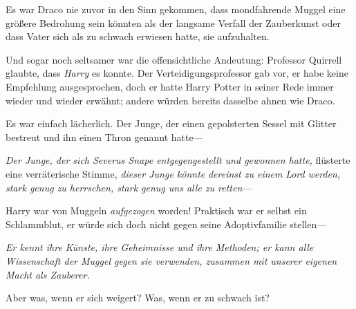 Es war Draco nie zuvor in den Sinn gekommen, dass mondfahrende Muggel eine größere Bedrohung sein könnten als der langsame Verfall der Zauberkunst oder dass Vater sich als zu schwach erwiesen hatte, sie aufzuhalten.

Und sogar noch seltsamer war die offensichtliche Andeutung: Professor Quirrell glaubte, dass \emph{Harry} es konnte. Der Verteidigungsprofessor gab vor, er habe keine Empfehlung ausgesprochen, doch er hatte Harry Potter in seiner Rede immer wieder und wieder erwähnt; andere würden bereits dasselbe ahnen wie Draco.

Es war einfach lächerlich. Der Junge, der einen gepolsterten Sessel mit Glitter bestreut und ihn einen Thron genannt hatte—

\emph{Der Junge, der sich Severus Snape entgegengestellt und gewonnen hatte,} flüsterte eine verräterische Stimme, \emph{dieser Junge könnte} \emph{dereinst zu einem} \emph{Lord} \emph{werden, stark genug zu herrschen, stark genug uns alle zu retten}—

Harry war von Muggeln \emph{aufgezogen} worden! Praktisch war er selbst ein Schlammblut, er würde sich doch nicht gegen seine Adoptivfamilie stellen—

\emph{Er kennt ihre Künste, ihre Geheimnisse und ihre Methoden; er kann alle Wissenschaft der Muggel gegen sie verwenden, zusammen mit unserer eigenen Macht als Zauberer.}

Aber was, wenn er sich weigert? Was, wenn er zu schwach ist?

